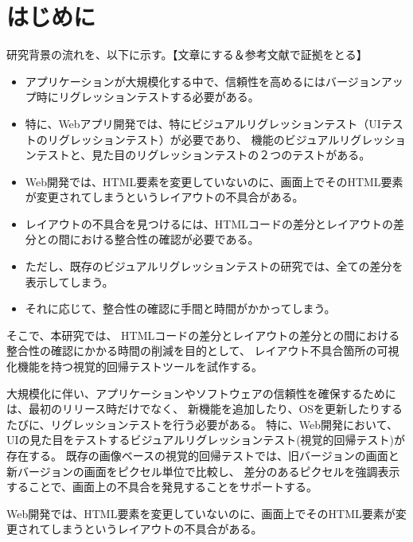 \chapter{はじめに}\label{cha:Introduction}

研究背景の流れを、以下に示す。【文章にする＆参考文献で証拠をとる】
\begin{itemize}
    \item アプリケーションが大規模化する中で、信頼性を高めるにはバージョンアップ時にリグレッションテストする必要がある。
    \item 特に、Webアプリ開発では、特にビジュアルリグレッションテスト（UIテストのリグレッションテスト）が必要であり、
          機能のビジュアルリグレッションテストと、見た目のリグレッションテストの２つのテストがある。
    \item Web開発では、HTML要素を変更していないのに、画面上でそのHTML要素が変更されてしまうというレイアウトの不具合がある。
    \item レイアウトの不具合を見つけるには、HTMLコードの差分とレイアウトの差分との間における整合性の確認が必要である。
    \item ただし、既存のビジュアルリグレッションテストの研究では、全ての差分を表示してしまう。
    \item それに応じて、整合性の確認に手間と時間がかかってしまう。
\end{itemize}
そこで、本研究では、
HTMLコードの差分とレイアウトの差分との間における整合性の確認にかかる時間の削減を目的として、
レイアウト不具合箇所の可視化機能を持つ視覚的回帰テストツール\toolName を試作する。




大規模化に伴い、アプリケーションやソフトウェアの信頼性を確保するためには、最初のリリース時だけでなく、
新機能を追加したり、OSを更新したりするたびに、リグレッションテストを行う必要がある\cite{RegionDetect}。
特に、Web開発において、UIの見た目をテストするビジュアルリグレッションテスト(視覚的回帰テスト)が存在する。
既存の画像ベースの視覚的回帰テストでは、旧バージョンの画面と新バージョンの画面をピクセル単位で比較し、
差分のあるピクセルを強調表示することで、画面上の不具合を発見することをサポートする。

Web開発では、HTML要素を変更していないのに、画面上でそのHTML要素が変更されてしまうというレイアウトの不具合がある。



